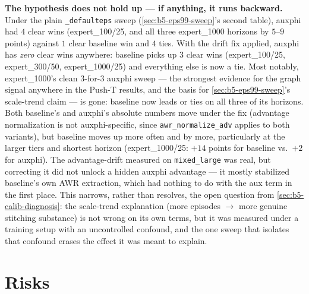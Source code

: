 \documentclass[11pt]{article}
\begin{document}
\textbf{The hypothesis does not hold up --- if anything, it runs backward.} Under the
plain \texttt{\_defaulteps} sweep (\cref{sec:b5-eps99-sweep}'s second table), auxphi had
$4$ clear wins (expert\_100/25, and all three expert\_1000 horizons by $5$--$9$ points) against
$1$ clear baseline win and $4$ ties. With the drift fix applied, auxphi has \emph{zero} clear
wins anywhere: baseline picks up $3$ clear wins (expert\_100/25, expert\_300/50,
expert\_1000/25) and everything else is now a tie. Most notably, expert\_1000's clean
$3$-for-$3$ auxphi sweep --- the strongest evidence for the graph signal anywhere in the
Push-T results, and the basis for \cref{sec:b5-eps99-sweep}'s scale-trend claim --- is gone:
baseline now leads or ties on all three of its horizons. Both baseline's and auxphi's
absolute numbers move under the fix (advantage normalization is not auxphi-specific, since
\texttt{awr\_normalize\_adv} applies to both variants), but baseline moves up more often and
by more, particularly at the larger tiers and shortest horizon (expert\_1000/25: $+14$
points for baseline vs.\ $+2$ for auxphi). The advantage-drift measured on
\texttt{mixed\_large} was real, but correcting it did not unlock a hidden auxphi advantage
--- it mostly stabilized baseline's own AWR extraction, which had nothing to do with the
aux term in the first place. This narrows, rather than resolves, the open question from
\cref{sec:b5-calib-diagnosis}: the scale-trend explanation (more episodes $\to$ more genuine
stitching substance) is not wrong on its own terms, but it was measured under a training
setup with an uncontrolled confound, and the one sweep that isolates that confound erases
the effect it was meant to explain.

\section{Risks}
\end{document}
